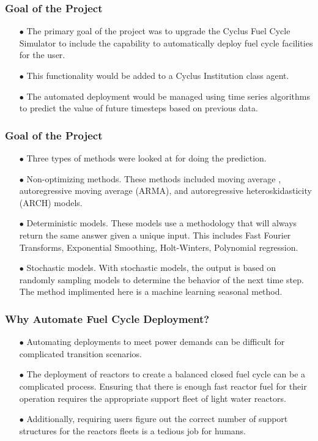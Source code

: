 \begin{frame}
  \frametitle{Goal of the Project}
  \begin{itemize}
      \item[$\bullet$] The primary goal of the project was to upgrade the Cyclus Fuel Cycle
                       Simulator to include the capability to automatically deploy fuel
                       cycle facilities for the user.
      \item[$\bullet$] This functionality would be added to a Cyclus Institution class agent.
      \item[$\bullet$] The automated deployment would be managed using time series algorithms
                       to predict the value of future timesteps based on previous data.
   \end{itemize}        
\end{frame}

\begin{frame}
  \frametitle{Goal of the Project}
  \begin{itemize}
    \item[$\bullet$] Three types of methods were looked at for doing the prediction.
    \item[$\bullet$] Non-optimizing methods. These methods included moving average
                     , autoregressive moving average (ARMA), and autoregressive
                     heteroskidasticity (ARCH) models. 
    \item[$\bullet$] Deterministic models. These models use a methodology that will
                     always return the same answer given a unique input. This includes
                     Fast Fourier Transforms, Exponential Smoothing, Holt-Winters,
                     Polynomial regression. 
    \item[$\bullet$] Stochastic models. With stochastic models, the output is based
                     on randomly sampling models to determine the behavior of the 
                     next time step. The method implimented here is a machine learning
                     seasonal method. 
   \end{itemize}        
\end{frame}

\begin{frame}
  \frametitle{Why Automate Fuel Cycle Deployment?}
  \begin{itemize}
      \item[$\bullet$] Automating deployments to meet power demands can be difficult for complicated
                       transition scenarios. 
      \item[$\bullet$] The deployment of reactors to create a balanced closed fuel cycle can be a 
                       complicated process. Ensuring that there is enough fast reactor fuel for
                       their operation requires the appropriate support fleet of light water reactors.
      \item[$\bullet$] Additionally, requiring users figure out the correct number of support
                       structures for the reactors fleets is a tedious job for humans.
   \end{itemize}        
\end{frame}
